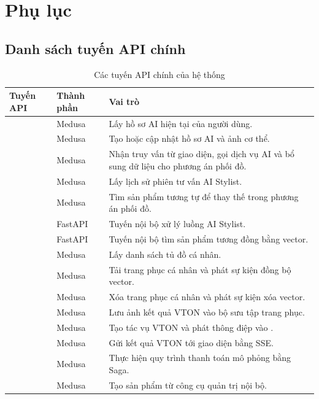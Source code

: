 \appendix
\chapter{Phụ lục}

\section{Danh sách tuyến API chính}

\begin{table}[H]
\centering
\scriptsize
\renewcommand{\arraystretch}{1.12}
\caption{Các tuyến API chính của hệ thống}
\begin{tabularx}{\textwidth}{L{4.8cm}L{2.2cm}Y}
\toprule
\textbf{Tuyến API} & \textbf{Thành phần} & \textbf{Vai trò} \\
\midrule
{}  & Medusa & Lấy hồ sơ AI hiện tại của người dùng. \\
\addlinespace
{}  & Medusa & Tạo hoặc cập nhật hồ sơ AI và ảnh cơ thể. \\
\addlinespace
{}  & Medusa & Nhận truy vấn từ giao diện, gọi dịch vụ AI và bổ sung dữ liệu cho phương án phối đồ. \\
\addlinespace
{}  & Medusa & Lấy lịch sử phiên tư vấn AI Stylist. \\
\addlinespace
{}  & Medusa & Tìm sản phẩm tương tự để thay thế trong phương án phối đồ. \\
\addlinespace
{}  & FastAPI & Tuyến nội bộ xử lý luồng AI Stylist. \\
\addlinespace
{}  & FastAPI & Tuyến nội bộ tìm sản phẩm tương đồng bằng vector. \\
\addlinespace
{}  & Medusa & Lấy danh sách tủ đồ cá nhân. \\
\addlinespace
{}  & Medusa & Tải trang phục cá nhân và phát sự kiện đồng bộ vector. \\
\addlinespace
{}  & Medusa & Xóa trang phục cá nhân và phát sự kiện xóa vector. \\
\addlinespace
{}  & Medusa & Lưu ảnh kết quả VTON vào bộ sưu tập trang phục. \\
\addlinespace
{}  & Medusa & Tạo tác vụ VTON và phát thông điệp vào . \\
\addlinespace
{}  & Medusa & Gửi kết quả VTON tới giao diện bằng SSE. \\
\addlinespace
{}  & Medusa & Thực hiện quy trình thanh toán mô phỏng bằng Saga. \\
\addlinespace
{}  & Medusa & Tạo sản phẩm từ công cụ quản trị nội bộ. \\
\bottomrule
\end{tabularx}
\end{table}

